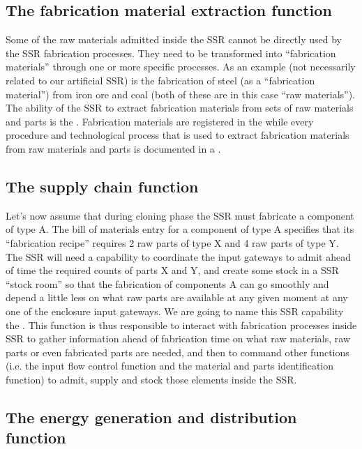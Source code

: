\subsection[The fabrication material extraction function]{The
fabrication material extraction function}

Some of the raw materials
admitted inside the SSR cannot be directly used by the SSR fabrication
processes. They need to be transformed into “fabrication materials”
through one or more specific processes. As an example (not necessarily
related to our artificial SSR) is the fabrication
of steel (as a “fabrication material”) from iron ore and coal (both of
these are in this case “raw materials”). The ability of the SSR to
extract fabrication materials from sets of raw materials and parts is
the .  Fabrication
materials are registered in the  
while every procedure and technological process that is used
to extract fabrication materials from raw materials and parts is
documented in a .

\subsection[The supply chain function]{The supply chain function}

Let’s now assume that during
cloning phase the SSR must fabricate a component of type A.  The bill
of materials entry for a component of type A specifies that its
“fabrication recipe” requires 2 raw parts of type X and 4 raw parts of
type Y.  The SSR will need a capability to coordinate the input
gateways to admit ahead of time the required counts of parts X and Y,
and create some stock in a SSR “stock room” so that the fabrication of
components A can go smoothly and depend a little less on what raw parts
are available at any given moment at any one of the enclosure input
gateways. We are going to name this SSR capability the . 
This function is thus responsible to interact with
fabrication processes inside SSR to gather information ahead of
fabrication time on what raw materials, raw parts or even fabricated
parts are needed, and then to command other functions (i.e. the input flow control function 
and the material and parts identification function) to admit, supply and stock
those elements inside the SSR.

\subsection[The energy generation and distribution function]{The energy
generation and distribution function}

